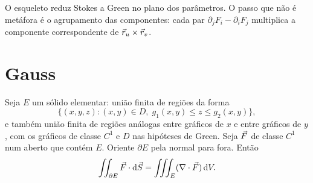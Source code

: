 \documentclass[11pt,a4paper]{article}
\begin{document}
O esqueleto reduz Stokes a Green no plano dos parâmetros. O passo que não é metáfora é o agrupamento das componentes: cada par $\partial_j F_i-\partial_i F_j$ multiplica a componente correspondente de $\vec{r}_u\times\vec{r}_v$.

\section{Gauss}

\begin{teorema}
\label{thm:gauss}
Seja $E$ um sólido elementar: união finita de regiões da forma
\[
\bigl\{(x,y,z):(x,y)\in D,\; g_1(x,y)\le z\le g_2(x,y)\bigr\},
\]
e também união finita de regiões análogas entre gráficos de $x$ e entre gráficos de $y$, com os gráficos de classe $C^1$ e $D$ nas hipóteses de Green. Seja $\vec{F}$ de classe $C^1$ num aberto que contém $E$. Oriente $\partial E$ pela normal para fora. Então
\[
\iint_{\partial E}\vec{F}\cdot\mathrm{d}\vec{S}
=\iiint_E(\nabla\cdot\vec{F})\,\mathrm{d} V.
\]
\end{teorema}
\end{document}
